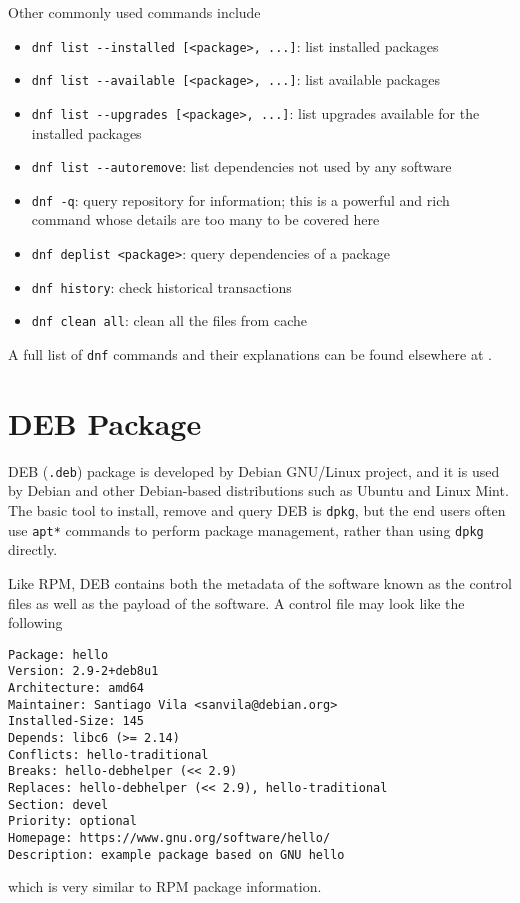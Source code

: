Other commonly used commands include
\begin{itemize}
	\item \verb|dnf list --installed [<package>, ...]|: list installed packages
	\item \verb|dnf list --available [<package>, ...]|: list available packages
	\item \verb|dnf list --upgrades [<package>, ...]|: list upgrades available for the installed packages
	\item \verb|dnf list --autoremove|: list dependencies not used by any software
	\item \verb|dnf -q|: query repository for information; this is a powerful and rich command whose details are too many to be covered here
	\item \verb|dnf deplist <package>|: query dependencies of a package
	\item \verb|dnf history|: check historical transactions
	\item \verb|dnf clean all|: clean all the files from cache
\end{itemize}

A full list of \verb|dnf| commands and their explanations can be found elsewhere at \cite{redhat2024dnf}.

\section{DEB Package}

DEB (\verb|.deb|) package is developed by Debian GNU/Linux project, and it is used by Debian and other Debian-based distributions such as Ubuntu and Linux Mint. The basic tool to install, remove and query DEB is \verb|dpkg|, but the end users often use \verb|apt*| commands to perform package management, rather than using \verb|dpkg| directly.

Like RPM, DEB contains both the metadata of the software known as the control files as well as the payload of the software. A control file may look like the following \cite{debian2024debianpackagemanagement}
\begin{lstlisting}
Package: hello
Version: 2.9-2+deb8u1
Architecture: amd64
Maintainer: Santiago Vila <sanvila@debian.org>
Installed-Size: 145
Depends: libc6 (>= 2.14)
Conflicts: hello-traditional
Breaks: hello-debhelper (<< 2.9)
Replaces: hello-debhelper (<< 2.9), hello-traditional
Section: devel
Priority: optional
Homepage: https://www.gnu.org/software/hello/
Description: example package based on GNU hello
\end{lstlisting}
which is very similar to RPM package information.

